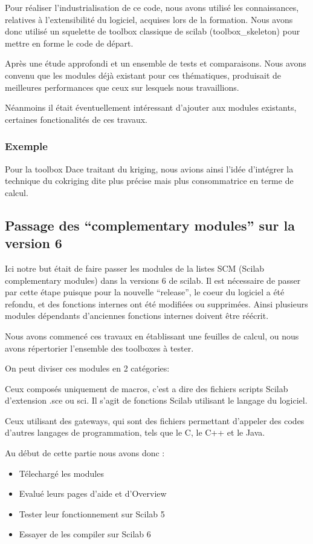 Pour réaliser l’industrialisation de ce code, nous avons utilisé les connaissances,
relatives à l’extensibilité du logiciel, acquises lors de la formation.
Nous avons donc utilisé un squelette de toolbox classique de scilab (toolbox\_skeleton)
pour mettre en forme le code de départ.

Après une étude approfondi et un ensemble de tests et comparaisons.
Nous avons convenu que les modules déjà existant pour ces thématiques,
produisait de meilleures performances que ceux sur lesquels nous travaillions.

Néanmoins il était éventuellement intéressant d’ajouter aux modules existants,
certaines fonctionalités de ces travaux.

\subsubsection*{Exemple}
Pour la toolbox Dace traitant du kriging, nous avions ainsi l’idée d'intégrer
la technique du cokriging dite plus précise mais plus consommatrice en terme de calcul.

\subsection*{Passage des ``complementary modules'' sur la version 6}

Ici notre but était de faire passer les modules de la listes SCM (Scilab complementary modules) dans la versions 6 de scilab. Il est nécessaire de passer par cette étape puisque pour la nouvelle “release”, le coeur du logiciel a été refondu, et des fonctions internes ont été modifiées ou supprimées. Ainsi plusieurs modules dépendants d’anciennes fonctions internes doivent être réécrit.

Nous avons commencé ces travaux en établissant une feuilles de calcul, ou nous avons répertorier l’ensemble des toolboxes à tester.

On peut diviser ces modules en 2 catégories:

Ceux composés uniquement de macros, c’est a dire des fichiers scripts Scilab d’extension .sce ou sci. Il s’agit de fonctions Scilab utilisant le langage du logiciel.

Ceux utilisant des gateways, qui sont des fichiers permettant d’appeler des codes d’autres langages de programmation, tels que le C, le C++ et le Java.

Au début de cette partie nous avons donc :

\begin{itemize}
\item Télechargé les modules
\item Evalué leurs pages d’aide et d’Overview
\item Tester leur fonctionnement sur Scilab 5
\item Essayer de les compiler sur Scilab 6
\end{itemize}

